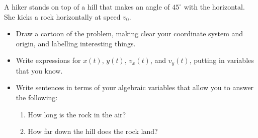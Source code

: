 \documentclass[12pt]{article}
\begin{document}
A hiker stands on top of a hill that makes an angle of $45^\circ$ with the horizontal. She kicks a rock horizontally at speed $v_0$.

\begin{itemize}

\item Draw a cartoon of the problem, making clear your coordinate system and origin, and labelling interesting
things.

\vspace{1.2in}

\item Write expressions for $x(t)$, $y(t)$, $v_x(t)$, and $v_y(t)$, putting in variables that you know.

\vspace{1.2in}

\item Write sentences in terms of your algebraic variables that allow you to answer the following:


\begin{enumerate}
\item How long is the rock in the air? 
\vspace{0.7in}
\item How far down the hill does the rock land? 
\vspace{0.7in}
\end{enumerate}
\end{itemize}
\end{document}
